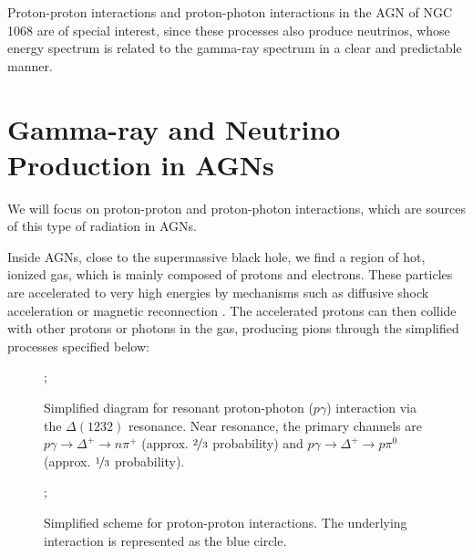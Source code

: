 Proton-proton interactions and proton-photon interactions in the AGN of NGC 1068 are of special interest, since these processes also produce neutrinos, whose energy spectrum is related to the gamma-ray spectrum in a clear and predictable manner.


\section{Gamma-ray and Neutrino Production in AGNs}

We will focus on proton-proton and proton-photon interactions, which are sources of this type of radiation in AGNs.

Inside AGNs, close to the supermassive black hole, we find a region of hot, ionized gas, which is mainly composed of protons and electrons. These particles are accelerated to very high energies by mechanisms such as diffusive shock acceleration or magnetic reconnection \citep{padovani2024highenergyneutrinosvicinitysupermassive}. The accelerated protons can then collide with other protons or photons in the gas, producing pions through the simplified processes specified below:


\begin{figure}[H]
    \centering
    ;
    \caption{Simplified diagram for resonant proton-photon ($p\gamma$) interaction via the $\Delta(1232)$ resonance. Near resonance, the primary channels are $p\gamma \rightarrow \Delta^+ \rightarrow n\pi^+$ (approx. $\nicefrac{2}{3}$ probability) and $p\gamma \rightarrow \Delta^+ \rightarrow p\pi^0$ (approx. $\nicefrac{1}{3}$ probability).}
  \end{figure}

\begin{figure}[H]
  \centering
  ;
  \caption{Simplified scheme for proton-proton interactions. The underlying interaction is represented as the blue circle.}

\end{figure}

